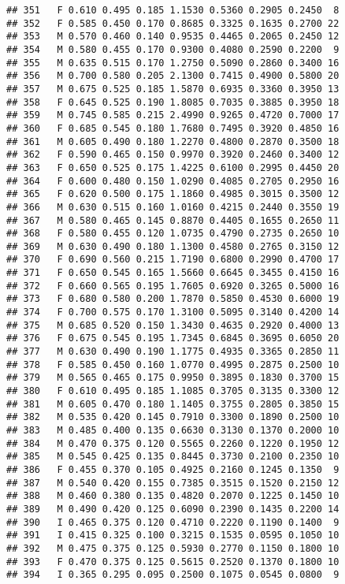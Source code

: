 \documentclass[
]{article}
\begin{document}
\begin{verbatim}
## 351   F 0.610 0.495 0.185 1.1530 0.5360 0.2905 0.2450  8
## 352   F 0.585 0.450 0.170 0.8685 0.3325 0.1635 0.2700 22
## 353   M 0.570 0.460 0.140 0.9535 0.4465 0.2065 0.2450 12
## 354   M 0.580 0.455 0.170 0.9300 0.4080 0.2590 0.2200  9
## 355   M 0.635 0.515 0.170 1.2750 0.5090 0.2860 0.3400 16
## 356   M 0.700 0.580 0.205 2.1300 0.7415 0.4900 0.5800 20
## 357   M 0.675 0.525 0.185 1.5870 0.6935 0.3360 0.3950 13
## 358   F 0.645 0.525 0.190 1.8085 0.7035 0.3885 0.3950 18
## 359   M 0.745 0.585 0.215 2.4990 0.9265 0.4720 0.7000 17
## 360   F 0.685 0.545 0.180 1.7680 0.7495 0.3920 0.4850 16
## 361   M 0.605 0.490 0.180 1.2270 0.4800 0.2870 0.3500 18
## 362   F 0.590 0.465 0.150 0.9970 0.3920 0.2460 0.3400 12
## 363   F 0.650 0.525 0.175 1.4225 0.6100 0.2995 0.4450 20
## 364   F 0.600 0.480 0.150 1.0290 0.4085 0.2705 0.2950 16
## 365   F 0.620 0.500 0.175 1.1860 0.4985 0.3015 0.3500 12
## 366   M 0.630 0.515 0.160 1.0160 0.4215 0.2440 0.3550 19
## 367   M 0.580 0.465 0.145 0.8870 0.4405 0.1655 0.2650 11
## 368   F 0.580 0.455 0.120 1.0735 0.4790 0.2735 0.2650 10
## 369   M 0.630 0.490 0.180 1.1300 0.4580 0.2765 0.3150 12
## 370   F 0.690 0.560 0.215 1.7190 0.6800 0.2990 0.4700 17
## 371   F 0.650 0.545 0.165 1.5660 0.6645 0.3455 0.4150 16
## 372   F 0.660 0.565 0.195 1.7605 0.6920 0.3265 0.5000 16
## 373   F 0.680 0.580 0.200 1.7870 0.5850 0.4530 0.6000 19
## 374   F 0.700 0.575 0.170 1.3100 0.5095 0.3140 0.4200 14
## 375   M 0.685 0.520 0.150 1.3430 0.4635 0.2920 0.4000 13
## 376   F 0.675 0.545 0.195 1.7345 0.6845 0.3695 0.6050 20
## 377   M 0.630 0.490 0.190 1.1775 0.4935 0.3365 0.2850 11
## 378   F 0.585 0.450 0.160 1.0770 0.4995 0.2875 0.2500 10
## 379   M 0.565 0.465 0.175 0.9950 0.3895 0.1830 0.3700 15
## 380   F 0.610 0.495 0.185 1.1085 0.3705 0.3135 0.3300 12
## 381   M 0.605 0.470 0.180 1.1405 0.3755 0.2805 0.3850 15
## 382   M 0.535 0.420 0.145 0.7910 0.3300 0.1890 0.2500 10
## 383   M 0.485 0.400 0.135 0.6630 0.3130 0.1370 0.2000 10
## 384   M 0.470 0.375 0.120 0.5565 0.2260 0.1220 0.1950 12
## 385   M 0.545 0.425 0.135 0.8445 0.3730 0.2100 0.2350 10
## 386   F 0.455 0.370 0.105 0.4925 0.2160 0.1245 0.1350  9
## 387   M 0.540 0.420 0.155 0.7385 0.3515 0.1520 0.2150 12
## 388   M 0.460 0.380 0.135 0.4820 0.2070 0.1225 0.1450 10
## 389   M 0.490 0.420 0.125 0.6090 0.2390 0.1435 0.2200 14
## 390   I 0.465 0.375 0.120 0.4710 0.2220 0.1190 0.1400  9
## 391   I 0.415 0.325 0.100 0.3215 0.1535 0.0595 0.1050 10
## 392   M 0.475 0.375 0.125 0.5930 0.2770 0.1150 0.1800 10
## 393   F 0.470 0.375 0.125 0.5615 0.2520 0.1370 0.1800 10
## 394   I 0.365 0.295 0.095 0.2500 0.1075 0.0545 0.0800  9

\end{verbatim}
\end{document}
